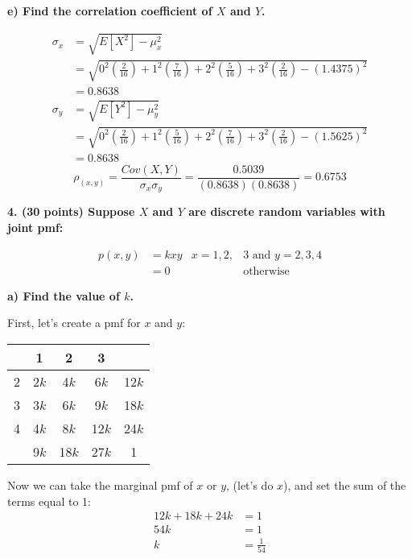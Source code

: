 \documentclass[12pt, letter]{article}
\begin{document}
\qquad \textbf{e) Find the correlation coefficient of $X$ and $Y$.}
\begin{center}
	\begin{align*}
		\sigma_{x} &= \sqrt{E[X^{2}] - \mu_{x}^{2}} \\
		&= \sqrt{0^{2}\left(\frac{2}{16}\right) + 1^{2}\left(\frac{7}{16}\right) + 2^{2}\left(\frac{5}{16}\right) + 3^{2}\left(\frac{2}{16}\right) - (1.4375)^{2}} \\
		&= 0.8638 \\
		\sigma_{y} &= \sqrt{E[Y^{2}] - \mu_{y}^{2}} \\
		&= \sqrt{0^{2}\left(\frac{2}{16}\right) + 1^{2}\left(\frac{5}{16}\right) + 2^{2}\left(\frac{7}{16}\right) + 3^{2}\left(\frac{2}{16}\right) - (1.5625)^{2}} \\
		&= 0.8638
	\end{align*}
	$$\rho_{(x,y)} = \frac{Cov(X,Y)}{\sigma_{x}\sigma_{y}} = \frac{0.5039}{(0.8638)(0.8638)} = \boxed{0.6753}$$
\end{center}

\textbf{4. (30 points) Suppose $X$ and $Y$ are discrete random variables with joint pmf:}
\begin{center}
	\begin{align*}
		p(x,y) &= kxy & x=1,2,&3 \text{ and } y=2,3,4 \\
		&=0 & &\text{otherwise}
	\end{align*}
\end{center}

\qquad \textbf{a) Find the value of $k$.}
\begin{center}
	First, let's create a pmf for $x$ and $y$:
	\newline
	\newline
	\def\arraystretch{1.5}
	\begin{tabular}{c|ccc|c}
		\backslashbox{$y$}{$x$} & 1 & 2 & 3 & \\
		\hline
		2 & 2$k$ & 4$k$ & 6$k$ & 12$k$ \\
		3 & 3$k$ & 6$k$ & 9$k$ & 18$k$ \\
		4 & 4$k$ & 8$k$ & 12$k$ & 24$k$ \\
		\hline
		& 9$k$ & 18$k$ & 27$k$ & 1
	\end{tabular}
	\newline
	\newline
	Now we can take the marginal pmf of $x$ or $y$, (let's do $x$), and set the sum of the terms equal to 1:
	\begin{align*}
		12k + 18k + 24k &= 1 \\
		54k &= 1 \\
		k &= \boxed{\frac{1}{54}}
	\end{align*}
\end{center}
\end{document}
